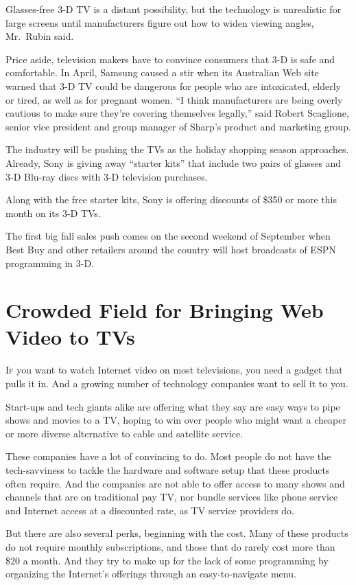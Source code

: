 ﻿\documentclass[12pt]{article}
\begin{document}
Glasses-free 3-D TV is a distant possibility, but the technology is unrealistic for large screens
until manufacturers figure out how to widen viewing angles, Mr.~Rubin said.

Price aside, television makers have to convince consumers that 3-D is safe and comfortable. In
April, Samsung caused a stir when its Australian Web site warned that 3-D TV could be dangerous for
people who are intoxicated, elderly or tired, as well as for pregnant women. ``I think manufacturers
are being overly cautious to make sure they're covering themselves legally,'' said Robert Scaglione,
senior vice president and group manager of Sharp's product and marketing group.

The industry will be pushing the TVs as the holiday shopping season approaches. Already, Sony is
giving away ``starter kits'' that include two pairs of glasses and 3-D Blu-ray discs with 3-D
television purchases.

Along with the free starter kits, Sony is offering discounts of \$350 or more this month on its 3-D
TVs.

The first big fall sales push comes on the second weekend of September when Best Buy and other
retailers around the country will host broadcasts of ESPN programming in 3-D.

\pagebreak
\section{Crowded Field for Bringing Web Video to TVs}

\lettrine{I}{f} you want to watch Internet video on most televisions, you
need a gadget that pulls it in. And a growing number of technology companies want to sell it to you.

Start-ups and tech giants alike are offering what they say are easy ways to pipe shows and movies to
a TV, hoping to win over people who might want a cheaper or more diverse alternative to cable and
satellite service.

These companies have a lot of convincing to do. Most people do not have the tech-savviness to tackle
the hardware and software setup that these products often require. And the companies are not able to
offer access to many shows and channels that are on traditional pay TV, nor bundle services like
phone service and Internet access at a discounted rate, as TV service providers do.

But there are also several perks, beginning with the cost. Many of these products do not require
monthly subscriptions, and those that do rarely cost more than \$20 a month. And they try to make up
for the lack of some programming by organizing the Internet's offerings through an easy-to-navigate
menu.
\end{document}
